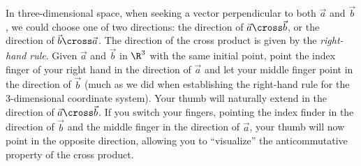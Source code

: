 \documentclass{ximera}
\begin{document}
In three-dimensional space, when seeking a vector perpendicular to both 
$\vec a$ and $\vec b$, we could choose one of two directions: the direction
of $\vec{a}\cross\vec{b}$, or the direction of
$\vec{b}\cross\vec{a}$.  The direction of the cross product is given
by the \textit{right-hand rule}.  Given $\vec{a}$ and $\vec{b}$ in
$\R^3$ with the same initial point, point the index finger of your
right hand in the direction of $\vec{a}$ and let your middle finger
point in the direction of $\vec{b}$ (much as we did when establishing
the right-hand rule for the 3-dimensional coordinate system). Your
thumb will naturally extend in the direction of
$\vec{a}\cross\vec{b}$.  If you switch your fingers, pointing the index finder in
the direction of $\vec{b}$ and the middle finger in the direction of
$\vec{a}$, your thumb will now point in the opposite direction,
allowing you to ``visualize'' the anticommutative property of the
cross product.
\end{document}
